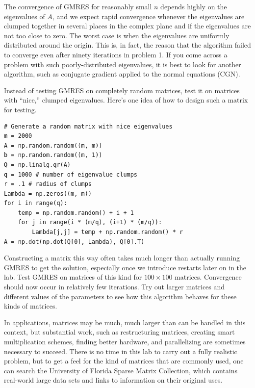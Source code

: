 The convergence of GMRES for reasonably small $n$ depends highly on the eigenvalues of $A$, and we expect rapid convergence whenever 
the eigenvalues are clumped together in several places in the complex plane and if the eigenvalues are not too close to zero.
The worst case is when the eigenvalues are uniformly distributed around the origin.
This is, in fact, the reason that the algorithm failed to converge even after ninety iterations in problem 1.
If you come across a problem with such poorly-distributed eigenvalues, it is best to look for another algorithm, such as conjugate 
gradient applied to the normal equations (CGN).

\begin{problem}
Instead of testing GMRES on completely random matrices, test it on matrices with ``nice,'' clumped eigenvalues.
Here's one idea of how to design such a matrix for testing.
\begin{lstlisting}
# Generate a random matrix with nice eigenvalues
m = 2000
A = np.random.random((m, m))
b = np.random.random((m, 1))
Q = np.linalg.qr(A)
q = 1000 # number of eigenvalue clumps
r = .1 # radius of clumps
Lambda = np.zeros((m, m))
for i in range(q):
    temp = np.random.random() + i + 1
    for j in range(i * (m/q), (i+1) * (m/q)):
        Lambda[j,j] = temp + np.random.random() * r
A = np.dot(np.dot(Q[0], Lambda), Q[0].T)
\end{lstlisting}
Constructing a matrix this way often takes much longer than actually running GMRES to get the solution, especially once we introduce restarts later on in the lab.
Test GMRES on matrices of this kind for $100\times 100$ matrices.
Convergence should now occur in relatively few iterations.
Try out larger matrices and different values of the parameters to see how this algorithm behaves for these kinds of matrices.
\label{prob:GMRESClumps}
\end{problem}

\begin{info}
In applications, matrices may be much, much larger than can be handled in this context, but substantial work, such as restructuring matrices, creating smart multiplication schemes, finding better hardware, and parallelizing are sometimes necessary to succeed.
There is no time in this lab to carry out a fully realistic problem, but to get a feel for the kind of matrices that are commonly used, one can search the University of Florida Sparse Matrix Collection, which contains real-world large data sets and links to information on their original uses.
\end{info}

